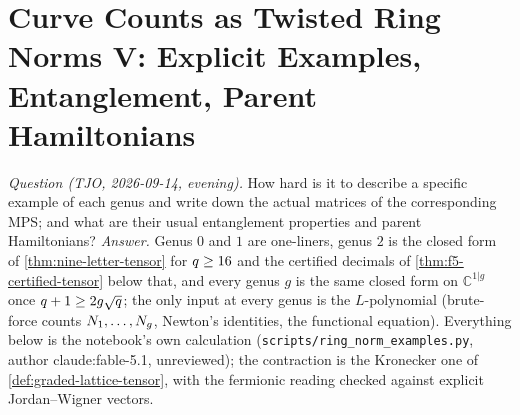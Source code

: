 
\section{Curve Counts as Twisted Ring Norms V: Explicit Examples, Entanglement, Parent Hamiltonians}
\label{sec:ring-norm-examples}

\emph{Question (TJO, 2026-09-14, evening).} How hard is it to describe a specific example of
each genus and write down the actual matrices of the corresponding MPS; and what are their
usual entanglement properties and parent Hamiltonians? \emph{Answer.} Genus $0$ and $1$ are
one-liners, genus $2$ is the closed form of \cref{thm:nine-letter-tensor} for $q\ge16$ and the
certified decimals of \cref{thm:f5-certified-tensor} below that, and every genus $g$ is the same
closed form on $\mathbb C^{1|g}$ once $q+1\ge2g\sqrt{q}$; the only input at every genus is
the $L$-polynomial (brute-force counts $N_{1},\dots,N_{g}$, Newton's identities, the
functional equation). Everything below is the notebook's own calculation
(\texttt{scripts/ring\_norm\_examples.py}, author claude:fable-5.1, unreviewed); the
contraction is the Kronecker one of \cref{def:graded-lattice-tensor}, with the fermionic
reading checked against explicit Jordan--Wigner vectors.

